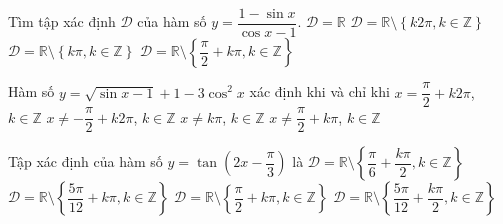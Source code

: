 \begin{ex}%
	Tìm tập xác định $\mathscr{D}$ của hàm số  $y=\dfrac{1-\sin x}{\cos x-1}$.
	 \choice
		{$\mathscr{D}=\mathbb{R}$} 
		{\True $\mathscr{D}=\mathbb{R}\setminus \left\{k2\pi, k\in \mathbb{Z}\right\}$} 
		{$\mathscr{D}=\mathbb{R}\setminus \left\{k\pi, k\in \mathbb{Z}\right\}$} 
		{$\mathscr{D}=\mathbb{R}\setminus \left\{\dfrac{\pi}{2}+k\pi, k\in  \mathbb{Z}\right\}$}
\end{ex}

\begin{ex}%
	Hàm số $y=\sqrt{\sin x-1}+1-3\cos ^2x$ xác định  khi và chỉ khi
	 \choice
		{\True $x=\dfrac{\pi}{2}+k2\pi$, $  k\in \mathbb{Z}$}
		{$x\ne-\dfrac{\pi}{2}+k2\pi$, $  k\in \mathbb{Z}$}
		{$x\ne k\pi$, $ k\in \mathbb{Z}$} 
		{$x\ne  \dfrac{\pi}{2}+k\pi$, $ k\in \mathbb{Z}$}
\end{ex}

\begin{ex}%
	Tập  xác định của hàm số $y=\tan\left(2x-\dfrac{\pi}{3}\right)$ là
	\choice 
		{$\mathscr{D}=\mathbb{R}\setminus\left\{\dfrac{\pi}{6}+\dfrac{k\pi}{2},k\in\mathbb{Z}\right\}$} 
		 {$\mathscr{D}=\mathbb{R}\setminus\left\{\dfrac{5\pi}{12}+k\pi ,k\in\mathbb{Z}\right\}$}
		 {$\mathscr{D}=\mathbb{R}\setminus\left\{\dfrac{\pi}{2}+k\pi ,k\in\mathbb{Z}\right\}$}
		{\True $\mathscr{D}=\mathbb{R}\setminus\left\{\dfrac{5\pi}{12}+\dfrac{k\pi}{2},k\in\mathbb{Z}\right\}$} 
\end{ex}

